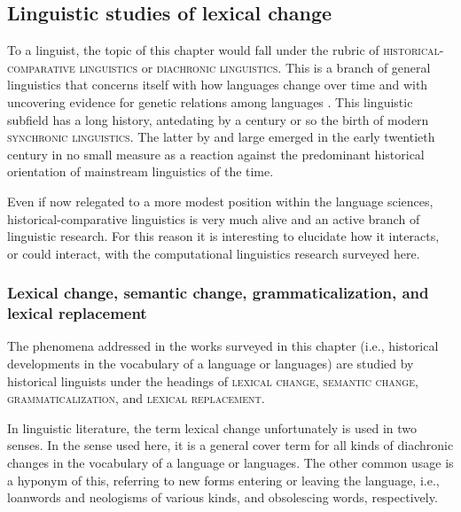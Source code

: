 \documentclass[output=paper]{langsci/langscibook}
\begin{document}
\subsection{Linguistic studies of lexical change}
To a linguist, the topic of this chapter would fall under the
rubric of \textsc{historical-comparative linguistics} or
\textsc{diachronic linguistics}. This is a branch of general linguistics that
concerns itself with how languages change over time and with
uncovering evidence for genetic relations among languages
\citep{anttila-1972,campbell,hl-handbook}. This linguistic subfield
has a long history, antedating by a century or so the birth
of modern \textsc{synchronic linguistics}. The latter by and large emerged in
the early twentieth century in no small measure as a reaction against
the predominant historical orientation of mainstream linguistics of the time.

Even if now relegated to a more modest position within the
language sciences, historical-comparative linguistics is very
much alive and an active branch of linguistic research. For this
reason it is interesting to elucidate how it interacts, or could
interact, with the computational linguistics research surveyed here.

\subsubsection{Lexical change, semantic change, grammaticalization, and lexical replacement}

The phenomena addressed in the works surveyed in this chapter
(i.e., historical developments in the vocabulary of a language or languages) are
studied by historical linguists under the headings of \textsc{lexical change}, \textsc{semantic change}, \textsc{grammaticalization}, and \textsc{lexical replacement}.

In linguistic literature, the term lexical change unfortunately is used in two senses. In the sense  used here, it is a general cover term for all kinds of diachronic changes in the vocabulary of a language or languages. The other common usage is a hyponym of this, referring to new forms entering or leaving the language, i.e., loanwords and
neologisms of various kinds, and obsolescing words, respectively. 
\end{document}
